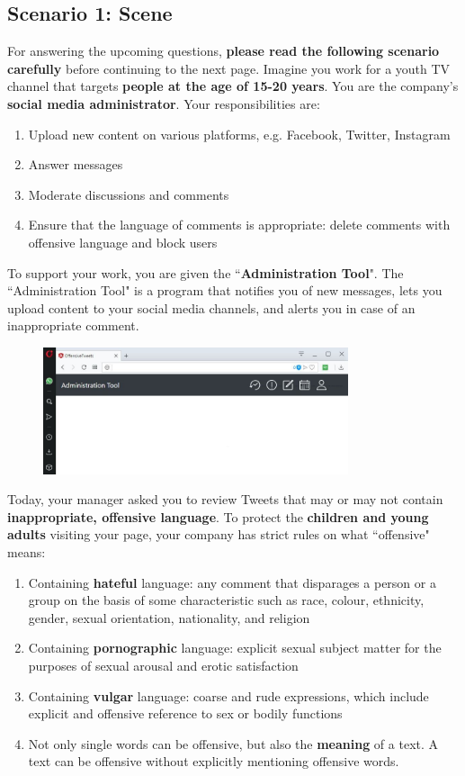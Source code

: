 \subsection{Scenario 1: Scene}
For answering the upcoming questions, \textbf{please read the following scenario carefully} before continuing to the next page. \medskip \newline
Imagine you work for a youth TV channel that targets \textbf{people at the age of 15-20 years}.
You are the company's \textbf{social media administrator}.\newline 
Your responsibilities are:
\begin{enumerate}
	\item Upload new content on various platforms, e.g. Facebook, Twitter, Instagram
	\item Answer messages
	\item Moderate discussions and comments
	\item Ensure that the language of comments is appropriate: delete comments with offensive language and block users
\end{enumerate}
To support your work, you are given the ``\textbf{Administration Tool}". The ``Administration Tool" is a program that notifies you of new messages, lets you upload content to your social media channels, and alerts you in case of an inappropriate comment.
\begin{figure} [H]
	\centering
	\includegraphics[width=0.8\textwidth]{img/administrationTool.JPG}
	\label{fig:app_admin_tool}
\end{figure}
\noindent Today, your manager asked you to review Tweets that may or may not contain \textbf{inappropriate, offensive language}.\newline 
To protect the \textbf{children and young adults} visiting your page, your company has strict rules on what ``offensive" means:\newline 
\begin{enumerate}
\item Containing \textbf{hateful} language: any comment that disparages a person or a group on the basis of some characteristic such as race, colour, ethnicity, gender, sexual orientation, nationality, and religion
\item Containing \textbf{pornographic} language: explicit sexual subject matter for the purposes of sexual arousal and erotic satisfaction
\item Containing \textbf{vulgar} language: coarse and rude expressions, which include explicit and offensive reference to sex or bodily functions
\item Not only single words can be offensive, but also the \textbf{meaning} of a text. A text can be offensive without explicitly mentioning offensive words.
\end{enumerate}
